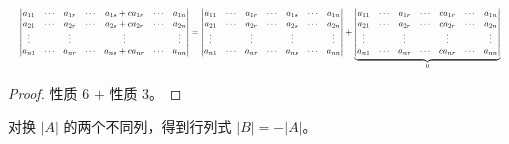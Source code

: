 \begin{proposition}[性质 7]
\[
\resizebox{\linewidth}{!}{$\displaystyle
\begin{vmatrix}
a_{11} & \cdots & a_{1r} & \cdots & a_{1s}+ca_{1r} & \cdots & a_{1n}\\
a_{21} & \cdots & a_{2r} & \cdots & a_{2s}+ca_{2r} & \cdots & a_{2n}\\
\vdots & & \vdots & & \vdots & & \vdots\\
a_{n1} & \cdots & a_{nr} & \cdots & a_{ns}+ca_{nr} & \cdots & a_{nn}
\end{vmatrix}
=
\begin{vmatrix}
a_{11} & \cdots & a_{1r} & \cdots & a_{1s} & \cdots & a_{1n}\\
a_{21} & \cdots & a_{2r} & \cdots & a_{2s} & \cdots & a_{2n}\\
\vdots & & \vdots & & \vdots & & \vdots\\
a_{n1} & \cdots & a_{nr} & \cdots & a_{ns} & \cdots & a_{nn}
\end{vmatrix}
+
\underbrace{\begin{vmatrix}
a_{11} & \cdots & a_{1r} & \cdots & ca_{1r} & \cdots & a_{1n}\\
a_{21} & \cdots & a_{2r} & \cdots & ca_{2r} & \cdots & a_{2n}\\
\vdots & & \vdots & & \vdots & & \vdots\\
a_{n1} & \cdots & a_{nr} & \cdots & ca_{nr} & \cdots & a_{nn}
\end{vmatrix}}_{0}$}
\]
\end{proposition}

\begin{proof}
性质 6 $+$ 性质 3。
\end{proof}

\begin{proposition}[性质 4]
对换 $|A|$ 的两个不同列，得到行列式 $|B|=-|A|$。
\end{proposition}

